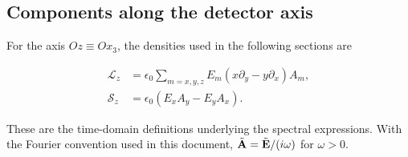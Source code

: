 \subsection{Components along the detector axis}

For the axis $Oz\equiv Ox_3$, the densities used in the following sections
are
\begin{highlightbox}
  \begin{align}
    \mathcal L_z
    &=\epsilon_0\sum_{m=x,y,z}E_m
      (x\partial_y-y\partial_x)A_m,\\
    \mathcal S_z&=\epsilon_0(E_x A_y-E_y A_x).
    \label{eq:am-general-axial-spin-orbital-densities}
  \end{align}
\end{highlightbox}
These are the time-domain definitions underlying the spectral expressions.
With the Fourier convention used in this document,
$\tilde{\bf A}=\tilde{\bf E}/(i\omega)$ for $\omega>0$.
